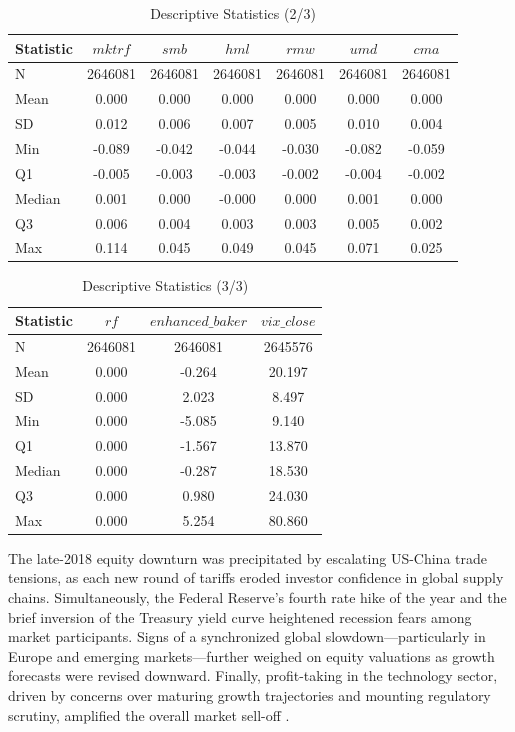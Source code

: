   \begin{table}[H]
  \centering
  \caption{Descriptive Statistics (2/3)}
  \label{tab:descr_stats2}
  
  \begin{tabular}{lcccccc}
  \toprule
  Statistic & $mktrf$ & $smb$ & $hml$ & $rmw$ & $umd$ & $cma$ \\\midrule
  N & 2646081 & 2646081 & 2646081 & 2646081 & 2646081 & 2646081 \\
  Mean & 0.000 & 0.000 & 0.000 & 0.000 & 0.000 & 0.000 \\
  SD & 0.012 & 0.006 & 0.007 & 0.005 & 0.010 & 0.004 \\
  Min & -0.089 & -0.042 & -0.044 & -0.030 & -0.082 & -0.059 \\
  Q1 & -0.005 & -0.003 & -0.003 & -0.002 & -0.004 & -0.002 \\
  Median & 0.001 & 0.000 & -0.000 & 0.000 & 0.001 & 0.000 \\
  Q3 & 0.006 & 0.004 & 0.003 & 0.003 & 0.005 & 0.002 \\
  Max & 0.114 & 0.045 & 0.049 & 0.045 & 0.071 & 0.025 \\
  \bottomrule
  \end{tabular}
  \end{table}
  
  \begin{table}[H]
  \centering
  \caption{Descriptive Statistics (3/3)}
  \label{tab:descr_stats3}
  
  \begin{tabular}{lccc}
  \toprule
  Statistic & $rf$ & $enhanced\_baker$ & $vix\_close$ \\\midrule
  N & 2646081 & 2646081 & 2645576 \\
  Mean & 0.000 & -0.264 & 20.197 \\
  SD & 0.000 & 2.023 & 8.497 \\
  Min & 0.000 & -5.085 & 9.140 \\
  Q1 & 0.000 & -1.567 & 13.870 \\
  Median & 0.000 & -0.287 & 18.530 \\
  Q3 & 0.000 & 0.980 & 24.030 \\
  Max & 0.000 & 5.254 & 80.860 \\
  \bottomrule
  \end{tabular}
  \end{table}
  
  

The late-2018 equity downturn was precipitated by escalating US-China trade tensions, as each new round of tariffs eroded investor confidence in global supply chains. Simultaneously, the Federal Reserve's fourth rate hike of the year and the brief inversion of the Treasury yield curve heightened recession fears among market participants. Signs of a synchronized global slowdown—particularly in Europe and emerging markets—further weighed on equity valuations as growth forecasts were revised downward. Finally, profit-taking in the technology sector, driven by concerns over maturing growth trajectories and mounting regulatory scrutiny, amplified the overall market sell-off \cite{reuters_2018}.


